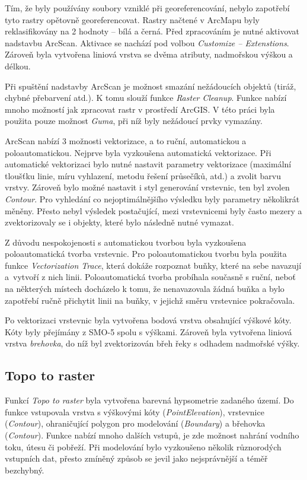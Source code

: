 \documentclass[thesis=M,czech]{FITthesis}[2012/06/26]
\begin{document}
Tím, že byly používány soubory vzniklé při georeferencování, nebylo zapotřebí tyto rastry opětovně georeferencovat. Rastry načtené v ArcMapu byly reklasifikovány na 2 hodnoty – bílá a černá. Před zpracováním je nutné aktivovat nadstavbu ArcScan. Aktivace se nachází pod volbou \textit{Customize – Extenstions}. Zároveň byla vytvořena liniová vrstva se dvěma atributy, nadmořskou výškou a délkou. 


Při spuštění nadstavby ArcScan je možnost smazání nežádoucích objektů (tiráž, chybné přebarvení atd.). K tomu slouží funkce \textit{Raster Cleanup}. Funkce nabízí mnoho možností jak zpracovat rastr v prostředí ArcGIS. V této práci byla použita pouze možnost \textit{Guma}, při níž byly nežádoucí prvky vymazány. 

ArcScan nabízí 3 možnosti vektorizace, a to ruční, automatickou a poloautomatickou. Nejprve byla vyzkoušena automatická vektorizace. Při automatické vektorizaci bylo nutné nastavit parametry vektorizace (maximální tloušťku linie, míru vyhlazení, metodu řešení průsečíků, atd.) a zvolit barvu vrstvy. Zároveň bylo možné nastavit i styl generování vrstevnic, ten byl zvolen \textit{Contour}. Pro vyhledání co nejoptimálnějšího výsledku byly parametry několikrát měněny. Přesto nebyl výsledek postačující, mezi vrstevnicemi byly často mezery a zvektorizovaly se i objekty, které bylo následně nutné vymazat. 

Z důvodu nespokojenosti s automatickou tvorbou byla vyzkoušena poloautomatická tvorba vrstevnic. Pro poloautomatickou tvorbu byla použita funkce \textit{Vectorization Trace}, která dokáže rozpoznat buňky, které na sebe navazují a~vytvoří z nich linii. Poloautomatická tvorba probíhala současně s ruční, neboť na některých místech docházelo k tomu, že nenavazovala žádná buňka a bylo zapotřebí ručně přichytit linii na buňky, v jejichž směru vrstevnice pokračovala.

Po vektorizaci vrstevnic byla vytvořena bodová vrstva obsahující výškové kóty. Kóty byly přejímány z SMO-5 spolu s výškami. Zároveň byla vytvořena liniová vrstva \textit{brehovka}, do níž byl zvektorizován břeh řeky s odhadem nadmořské výšky.



\subsection{Topo to raster}
Funkcí \textit{Topo to raster} byla vytvořena barevná hypsometrie zadaného území. Do funkce vstupovala vrstva s výškovými kóty (\textit{PointElevation}), vrstevnice (\textit{Contour}), ohraničující polygon pro modelování (\textit{Boundary}) a břehovka (\textit{Contour}). Funkce nabízí mnoho dalších vstupů, je zde možnost nahrání vodního toku, útesu či pobřeží. Při modelování bylo vyzkoušeno několik různorodých vstupních dat, přesto zmíněný způsob se jevil jako nejsprávnější a téměř bezchybný. 
\end{document}
